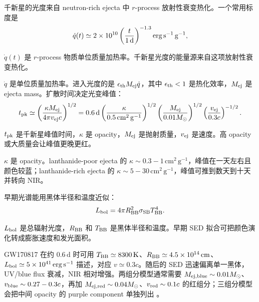 千新星的光度来自 neutron-rich ejecta 中 \(r\)-process 放射性衰变热化。一个常用标度是
\begin{equation}
  \dot q(t)\simeq
  2\times10^{10}
  \left(\frac{t}{1\,{\rm d}}\right)^{-1.3}
  {\rm erg\,s^{-1}\,g^{-1}},
  \label{eq:ch13-rprocess-heating}
\end{equation}
\begin{formulaexplain}
\(\dot q(t)\) 是 \(r\)-process 物质单位质量加热率。千新星光度的能量源来自这项放射性衰变热化。
\end{formulaexplain}
\(\dot q\) 是单位质量加热率。进入光度的是 \(\epsilon_{\rm th}M_{\rm ej}\dot q\)，其中 \(\epsilon_{\rm th}<1\) 是热化效率，\(M_{\rm ej}\) 是 ejecta mass。扩散时间决定光变峰值：
\begin{equation}
  t_{\rm pk}\simeq
  \left(\frac{\kappa M_{\rm ej}}{4\pi v_{\rm ej}c}\right)^{1/2}
  =
  0.6\,{\rm d}
  \left(\frac{\kappa}{0.5\,{\rm cm^2\,g^{-1}}}\right)^{1/2}
  \left(\frac{M_{\rm ej}}{0.01M_\odot}\right)^{1/2}
  \left(\frac{v_{\rm ej}}{0.3c}\right)^{-1/2}.
  \label{eq:ch13-kilonova-diffusion}
\end{equation}
\begin{formulaexplain}
\(t_{\rm pk}\) 是千新星峰值时间，\(\kappa\) 是 opacity，\(M_{\rm ej}\) 是抛射质量，\(v_{\rm ej}\) 是速度。高 opacity 或大质量会让峰值更晚更红。
\end{formulaexplain}
\(\kappa\) 是 opacity。lanthanide-poor ejecta 的 \(\kappa\sim0.3-1\,\mathrm{cm^2\,g^{-1}}\)，峰值在一天左右且颜色较蓝；lanthanide-rich ejecta 的 \(\kappa\sim5-30\,\mathrm{cm^2\,g^{-1}}\)，峰值可推到数天到十天并转向 NIR。

早期光谱能用黑体半径和温度近似：
\begin{equation}
  L_{\rm bol}=4\pi R_{\rm BB}^2\sigma_{\rm SB}T_{\rm BB}^4 .
  \label{eq:ch13-kilonova-blackbody}
\end{equation}
\begin{formulaexplain}
\(L_{\rm bol}\) 是总辐射光度，\(R_{\rm BB}\) 和 \(T_{\rm BB}\) 是黑体半径和温度。早期 SED 拟合可把颜色演化转成膨胀速度和发光面积。
\end{formulaexplain}
GW170817 在约 \(0.6\,\mathrm{d}\) 时可用 \(T_{\rm BB}\simeq8300\,\mathrm{K}\)、\(R_{\rm BB}\simeq4.5\times10^{14}\,\mathrm{cm}\)、\(L_{\rm bol}\simeq5\times10^{41}\,\mathrm{erg\,s^{-1}}\) 描述，对应 \(v\simeq0.3c\)。随后的 SED 迅速偏离单一黑体，UV/blue flux 衰减，NIR 相对增强。两组分模型通常需要 \(M_{\rm ej,blue}\sim0.01M_\odot\)、\(v_{\rm blue}\sim0.27-0.3c\)，再加 \(M_{\rm ej,red}\sim0.04M_\odot\)、\(v_{\rm red}\sim0.1c\) 的红组分；三组分模型会把中间 opacity 的 purple component 单独列出 \citep{2017Natur.551...75S,2017ApJ...848L..17C,2017ApJ...848L..27T,2017Sci...358.1565E}。

